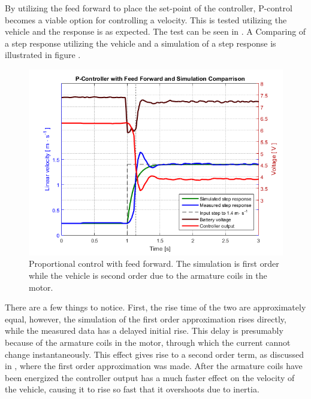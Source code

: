 By utilizing the feed forward to place the set-point of the controller, P-control becomes a viable option for controlling a velocity. This is tested utilizing the vehicle and the response is as expected. The test can be seen in . A Comparing of a step response utilizing the vehicle and a simulation of a step response is illustrated in figure .
%
\begin{figure}[H]
 	\centering
 	\includegraphics[width=.9\textwidth]{figures/stepPfeedForward}
 	\caption{Proportional control with feed forward. The simulation is first order while the vehicle is second order due to the armature coils in the motor.}
 	\label{fig:stepPfeedForward}
\end{figure}\vspace{-5mm}
%
There are a few things to notice. First, the rise time of the two are approximately equal, however, the simulation of the first order approximation rises directly, while the measured data has a delayed initial rise. This delay is presumably because of the armature coils in the motor, through which the current cannot change instantaneously. This effect gives rise to a second order term, as discussed in , where the first order approximation was made. After the armature coils have been energized the controller output has a much faster effect on the velocity of the vehicle, causing it to rise so fast that it overshoots due to inertia.

